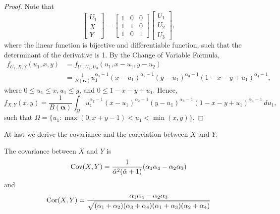 \begin{proof}
  Note that
  $$
  \begin{bmatrix}
    U_1 \\ X \\ Y
  \end{bmatrix}  = \begin{bmatrix}
    1 & 0 & 0 \\
    1 & 1 & 0 \\
    1 & 0 & 1
  \end{bmatrix}\begin{bmatrix}
    U_1 \\ U_2 \\ U_3
  \end{bmatrix}, 
  $$
  where the linear function is bijective and differentiable function, such
  that the determinant of the derivative is 1. By the Change of Variable
  Formula, 
  \begin{equation}
    \begin{split}
      f_{U_1,X,Y}(u_1,x,y) &= f_{U_1,U_2,U_3}(u_1, x - u_1, y - u_2) \\ 
      &= \frac{1}{B(\boldsymbol{\alpha})}u_1^{\alpha_1-1}(x-u_1)^{\alpha_2-1}(y-u_1 )^{\alpha_3-1}(1-x-y+u_1)^{\alpha_4-1},
    \end{split}
  \end{equation}
  where $0 \le u_1 \le x, u_1 \le y$, and $0 \le 1 - x - y + u_1$.  
  Hence,
  \begin{equation}
      \label{eq:dist-X-Y}
      f_{X,Y}(x,y) = \frac{1}{B(\boldsymbol{\alpha})}\int_{\Omega} u_1^{\alpha_1-1}(x-u_1)^{\alpha_2-1}(y-u_1)^{\alpha_3-1}(1-x-y+u_1)^{\alpha_4-1} \, du_1,
  \end{equation}
  such that $\Omega = \{u_1 : \max(0, x + y -1) < u_1 < \min(x,y)\}$.
\end{proof}

At last we derive the covariance and the correlation between $X$ and $Y$.

\begin{proposition}
  The covariance between $X$ and $Y$ is 
  $$\operatorname{Cov}(X,Y) = \frac{1}{\tilde{\alpha}^2(\tilde{\alpha}+1)}(\alpha_1\alpha_4 - \alpha_2\alpha_3)$$
  and
  $$\operatorname{Cor}(X,Y) = \frac{\alpha_1\alpha_4 - \alpha_2\alpha_3}{\sqrt{(\alpha_1+\alpha_2)(\alpha_3+\alpha_4)(\alpha_1+\alpha_3)(\alpha_2+\alpha_4)}}$$
\end{proposition}

